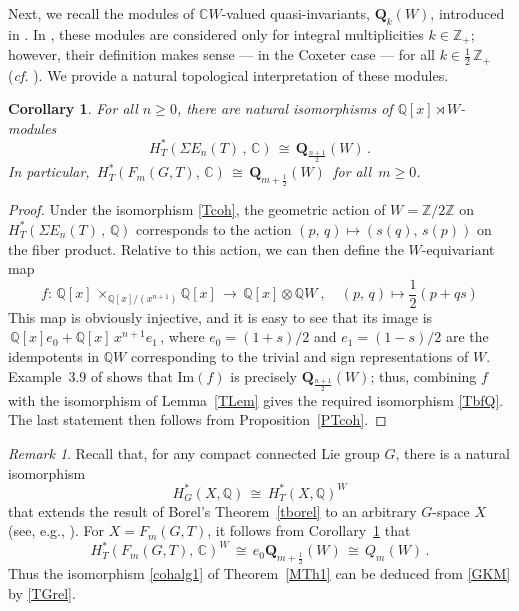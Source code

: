 \documentclass[11pt]{amsart}
\newtheorem{cor}[theorem]{Corollary}
\theoremstyle{definition}
\theoremstyle{remark}
\newtheorem{remark}[theorem]{Remark}
\numberwithin{equation}{section}
\newcommand{\la}{\label}
\def\C{\mathbb C}
\def\Z{\mathbb{Z}}
\def\Q{\mathbb{Q}}
\def\im{\mathrm{Im}}
\begin{document}
Next, we recall the modules of $\C W$-valued quasi-invariants, $ \mathbf{Q}_{k}(W) $,  introduced in \cite{BC11}. 
In \cite[Section~3.2]{BC11}, these modules are considered only for integral multiplicities $ k \in \Z_{+}$; however, their definition makes sense --- in the Coxeter case --- 
for all $ k \in \frac{1}{2}\, \Z_+ \,$ ({\it cf.} \cite[(3.8)]{BC11}). We provide a natural topological interpretation of these modules.
%
\begin{cor}
\la{RelBC}
For all $ n \ge 0 $, there are natural isomorphisms of $\Q[x] \rtimes W$-modules
%
\begin{equation}
\la{TbfQ}
H_{T}^*(\Sigma E_n(T)\,,\,\C)\,\cong\,  \mathbf{Q}_{\frac{n+1}{2}}(W)\,.    
\end{equation}
%
In particular, $\,H_{T}^*(F_m(G,T),\,\C)\,\cong\,  \mathbf{Q}_{m+\frac{1}{2}}(W)\,$ for all  $\, m \ge 0 $.
\end{cor}
%
\begin{proof} Under the isomorphism \eqref{Tcoh}, the geometric action of $W = \Z/2\Z $ on $ H_{T}^*(\Sigma E_n(T)\,,\,\Q) $ corresponds to the action $ (p,\,q) \mapsto (s(q),\,s(p)) $ on the fiber product. Relative to this action, we can then define the $W$-equivariant map 
%
$$
f:\,\Q[x]\,\times_{\Q[x]/(x^{n+1})} \Q[x]\,\to \,\Q[x] \otimes \Q W \ ,\quad
(p,\,q) \mapsto \frac{1}{2}(p+qs)
$$
%
This map is obviously injective, and it is easy to see that its image is
$\, \Q[x] e_0 + \Q[x]\, x^{n+1} e_1 \,$, where $e_0 = (1+s)/2 $ and $e_1 = (1-s)/2$ are the idempotents in $\Q W $ corresponding to the trivial and sign representations of $W$. 
Example~3.9 of \cite{BC11} shows that $ \im(f) $ is precisely $ \mathbf{Q}_{\frac{n+1}{2}}(W)$; thus, combining $f$ with the isomorphism of Lemma~\ref{TLem} 
gives the required isomorphism \eqref{TbfQ}. The last statement 
then follows from Proposition~\ref{PTcoh}.
\end{proof}
%
\begin{remark}\la{TGW}
Recall that, for any compact connected Lie group $G$, there is a natural isomorphism
%
\begin{equation}
\la{TGrel}
H^*_G(X, \Q) \,\cong\, H^*_T(X, \Q)^W 
\end{equation}
%
that extends the result of Borel's Theorem~\ref{tborel} to an arbitrary $G$-space $X$
(see, e.g., \cite[Chap. III, Prop. 1]{Hs75}). For $ X = F_m(G,T) $, it follows
from Corollary~\ref{RelBC} that 
%
$$
H_{T}^*(F_m(G,T),\,\C)^W \,\cong\, e_0 \mathbf{Q}_{m+\frac{1}{2}}(W) \,\cong\,
Q_m(W) \,.
$$
%
Thus the isomorphism \eqref{cohalg1} of Theorem~\ref{MTh1} can be deduced from \eqref{GKM} by \eqref{TGrel}.
\end{remark}
\end{document}
